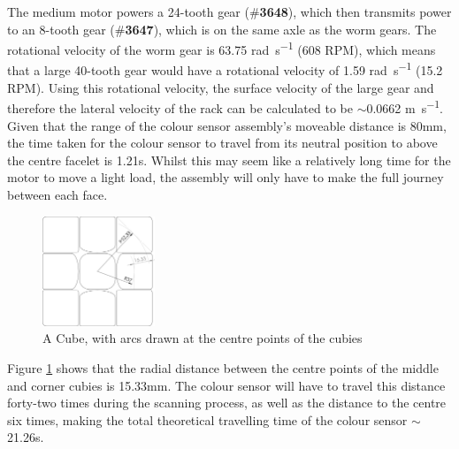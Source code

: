 \documentclass{report}
\newcommand{\tbo}[1]{\textbf{#1}}
\newcommand{\legopiece}[1]{(\#\tbo{#1})}
\begin{document}
	The medium motor powers a 24-tooth gear \legopiece{3648}, which then transmits power to an 8-tooth gear \legopiece{3647}, which is on the same axle as the worm gears. The rotational velocity of the worm gear is 63.75 \si{\radian\per\second} (608 RPM), which means that a large 40-tooth gear would have a rotational velocity of 1.59 \si{\radian\per\second} (15.2 RPM). Using this rotational velocity, the surface velocity of the large gear and therefore the lateral velocity of the rack can be calculated to be $\sim$0.0662 \si{\meter\per\second}. Given that the range of the colour sensor assembly's moveable distance is 80\si{\milli\metre}, the time taken for the colour sensor to travel from its neutral position to above the centre facelet is 1.21\si{\second}. Whilst this may seem like a relatively long time for the motor to move a light load, the assembly will only have to make the full journey between each face.
	
	\begin{figure}[H]
		\begin{center}
			\includegraphics[width=0.3\textwidth]{Resources/Images/dwgCubeProfileCentreArcs.png}
			\caption{A Cube, with arcs drawn at the centre points of the cubies}
			\label{fig:dwgCubeProfileCentreArcs}
		\end{center}
	\end{figure}

	Figure \ref{fig:dwgCubeProfileCentreArcs} shows that the radial distance between the centre points of the middle and corner cubies is 15.33\si{\milli\metre}. The colour sensor will have to travel this distance forty-two times during the scanning process, as well as the distance to the centre six times, making the total theoretical travelling time of the colour sensor $\sim$21.26\si{\second}.
\end{document}
